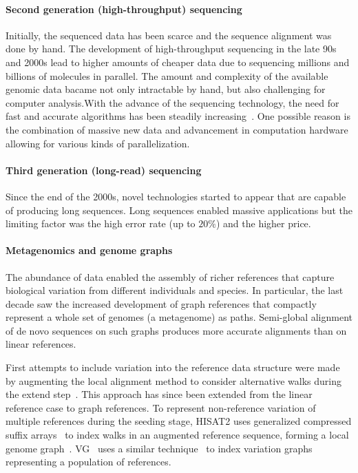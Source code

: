 \paragraph{Second generation (high-throughput) sequencing}
Initially, the sequenced data has been scarce and the sequence alignment was
done by hand. The development of high-throughput sequencing in the late 90s and
2000s lead to higher amounts of cheaper data due to sequencing millions and
billions of molecules in parallel. The amount and complexity of the available
genomic data bacame not only intractable by hand, but also challenging for
computer analysis.With the advance of the sequencing technology, the need for
fast and accurate algorithms has been steadily
increasing~\cite{alser2021technology}. One possible reason is the combination of
massive new data and advancement in computation hardware allowing for various
kinds of parallelization.

\paragraph{Third generation (long-read) sequencing}
Since the end of the 2000s, novel technologies started to appear that are
capable of producing long sequences. Long sequences enabled massive applications
but the limiting factor was the high error rate (up to $20\%$) and the higher
price.

\paragraph{Metagenomics and genome graphs}
The abundance of data enabled the assembly of richer references that capture
biological variation from different individuals and species. In particular, the
last decade saw the increased development of graph references that compactly
represent a whole set of genomes (a metagenome) as paths. Semi-global alignment
of de novo sequences on such graphs produces more accurate alignments than on
linear references.

First attempts to include variation into the reference data structure were made
by augmenting the local alignment method to consider alternative walks during the
extend step~\cite{schneeberger_simultaneous_2009,palmapper}. This approach has
since been extended from the linear reference case to graph references. To
represent non-reference variation of multiple references during the seeding
stage, HISAT2 uses generalized compressed suffix
arrays~\cite{siren_indexing_2014} to index walks in an augmented reference
sequence, forming a local genome graph~\cite{kim_graphbased_2019}.
VG~\cite{garrison_variation_2018} uses a similar
technique~\cite{siren_indexing_2017} to index variation graphs representing a
population of references.

